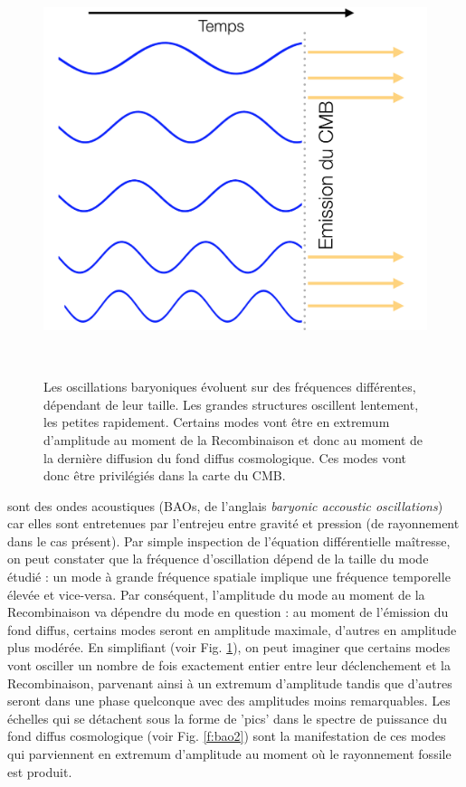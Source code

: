 \begin{figure}[htbp]
	\centering
		\includegraphics[height=12cm]{figs/bao1.png}
	\caption[Les oscillations baryoniques évoluent sur des fréquences différentes, dépendant de leur taille.]{Les oscillations baryoniques évoluent sur des fréquences différentes, dépendant de leur taille. Les grandes structures oscillent lentement, les petites rapidement. Certains modes vont être en extremum d'amplitude au moment de la Recombinaison et donc au moment de la dernière diffusion du fond diffus cosmologique. Ces modes vont donc être privilégiés dans la carte du CMB.}
	\label{f:bao1}
\end{figure}


  sont des ondes acoustiques (BAOs, de l'anglais \textit{baryonic accoustic oscillations}) car elles sont entretenues par l'entrejeu entre gravité et pression (de rayonnement dans le cas présent). Par simple inspection de l'équation différentielle maîtresse, on peut constater que la fréquence d'oscillation dépend de la taille du mode étudié : un mode à grande fréquence spatiale implique une fréquence temporelle élevée et vice-versa. Par conséquent, l'amplitude du mode au moment de la Recombinaison va dépendre du mode en question : au moment de l'émission du fond diffus, certains modes seront en amplitude maximale, d'autres en amplitude plus modérée. En simplifiant (voir Fig. \ref{f:bao1}), on peut imaginer que certains modes vont osciller un nombre de fois exactement entier entre leur déclenchement et la Recombinaison, parvenant ainsi à un extremum d'amplitude tandis que d'autres seront dans une phase quelconque avec des amplitudes moins remarquables. Les échelles qui se détachent sous la forme de 'pics' dans le spectre de puissance du fond diffus cosmologique (voir Fig. \ref{f:bao2}) sont la manifestation de ces modes qui parviennent en extremum d'amplitude au moment où le rayonnement fossile est produit.



